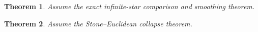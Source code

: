 \documentclass[11pt]{article}
\newtheorem{theorem}{Theorem}
\begin{document}
\begin{theorem}
\label{thm:p071-infinite-star-collapse-candidate}
Assume the exact infinite-star comparison and smoothing theorem.
\end{theorem}
\begin{theorem}
\label{thm:p071-stone-euclidean-collapse}
Assume the Stone--Euclidean collapse theorem.
\end{theorem}


\end{document}
